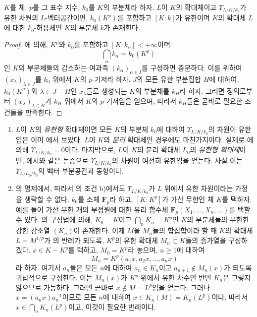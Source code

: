 \begin{corollary}[21.8.6]
\label{0.21.8.6-ko}
$K$를 체, $p$를 그 표수 지수, $k_0$를 $K$의 부분체라 하자.
$L$이 $K$의 확대체이고 $\Upsilon_{L/K/k_0}$가 유한 차원의
$L$-벡터공간이면, $k_0(K^p)$를 포함하고 $[K:k]$가 유한이며
$K$의 확대체 $L$에 대한 $k_0$-허용체인 $K$의 부분체 $k$가
존재한다.
\end{corollary}

\begin{proof}
에 의해, $K^p$와 $k_0$를 포함하고
$[K:k_\alpha]<+\infty$이며
\[
\bigcap_\alpha k_\alpha=k_0(K^p)
\]
인 $K$의 부분체들의 감소하는 여과족
$(k_\alpha)_{\alpha\in I}$를 구성하면 충분하다. 이를 위하여
$(x_\lambda)_{\lambda\in J}$를 $k_0$ 위에서 $K$의 $p$-기저라 하자.
$J$의 모든 유한 부분집합 $H$에 대하여, $k_0(K^p)$와
$\lambda\in J-H$인 $x_\lambda$들로 생성되는 $K$의 부분체를
$k_H$라 하자. 그러면 정의로부터
$(x_\lambda)_{\lambda\in H}$가 $k_H$ 위에서 $K$의 $p$-기저임을
얻으며, 따라서 $k_H$들은 곧바로 필요한 조건들을 만족한다.
\end{proof}

\begin{remarks}[21.8.7]
\label{0.21.8.7-ko}
\begin{enumerate}
  \item[(i)] $L$이 $K$의 \emph{유한형} 확대체이면 모든 $K$의
  부분체 $k_0$에 대하여 $\Upsilon_{L/K/k_0}$의 차원이 유한임은 이미
  에서 보았다. $L$이 $K$의 \emph{분리}
  확대체인 경우에도 마찬가지이다. 실제로
  에 의해 $\Upsilon_{L/K/k_0}=0$이다. 마지막으로,
  $L$이 $K$의 분리 확대체 $L_0$의 \emph{유한형 확대체}이면,
  에서와 같은 논증으로
  $\Upsilon_{L/K/k_0}$의 차원이 여전히 유한임을 얻는다. 사실 이는
  $\Upsilon_{L/L_0/k_0}$의 벡터 부분공간과 동형이다.

  \item[(ii)] 의 명제에서, 따라서
  의 조건 b)에서도 $\Upsilon_{L/K/k_0}$가
  $L$ 위에서 유한 차원이라는 가정을 생략할 수 없다. $k_0$를 소체
  $\mathbf F_p$라 하고, $[K:K^p]$가 가산 무한인 체 $K$를 택하자.
  예를 들어 가산 무한 개의 부정원에 대한 유리 함수체
  $\mathbf F_p(X_1,\ldots,X_n,\ldots)$를 택할 수 있다.
  의 구성법에 의해, $K_0=K$이고
  $\bigcap_nK_n=K^p$인 $K$의 부분체들의 무한한 강한 감소열
  $(K_n)$이 존재한다. 이제 $M$을 $M_n$들의 합집합이라 할 때
  $K$의 확대체 $L=M^{1/p}$가 의 반례가 되도록,
  $K^p$의 유한 확대체 $M_n\subset K$들의 증가열을 구성하겠다.
  $x\in K-K^p$를 택하고, $M_0=K^p$라 놓으며, $n\geqslant1$에
  대하여
  \[
  M_n=K^p(a_1x,a_2x,\ldots,a_nx)
  \]
  라 하자. 여기서 $a_n$들은 모든 $n$에 대하여
  $a_n\in K_n$이고 $a_{n+1}\notin M_n(x)$가 되도록 귀납적으로
  구성한다. 이는 $M_n(x)$가 $K^p$ 위에서 유한 차수인 반면
  $K_n$은 그렇지 않으므로 가능하다. 그러면 곧바로
  $x\notin M=L^p$임을 얻는다. 그러나
  $x=(a_nx)a_n^{-1}$이므로 모든 $n$에 대하여
  $x\in K_n(M)=K_n(L^p)$이다. 따라서
  $x\in\bigcap_nK_n(L^p)$이고, 이것이 필요한 반례이다.
\end{enumerate}
\end{remarks}

